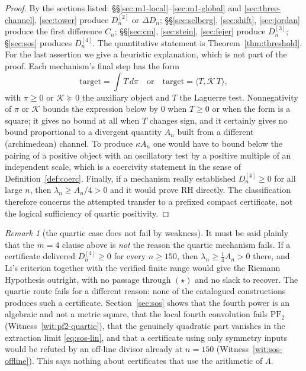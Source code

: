 \documentclass[11pt]{amsart}
\theoremstyle{definition}
\theoremstyle{remark}
\newtheorem{remark}[theorem]{Remark}
\theoremstyle{definition}
\begin{document}
\begin{proof}
By the sections listed: \S\S\ref{sec:m1-local}--\ref{sec:m1-global} and
\ref{sec:three-channel}, \ref{sec:tower} produce $D_n^{[2]}$ or $\Delta D_n$;
\S\S\ref{sec:selberg}, \ref{sec:shift}, \ref{sec:jordan} produce the first difference $C_n$;
\S\S\ref{sec:cm}, \ref{sec:stein}, \ref{sec:fejer} produce $D_n^{[3]}$; \S\ref{sec:sos} produces
$D_n^{[4]}$. The quantitative statement is Theorem~\ref{thm:threshold}. For the last assertion we
give a heuristic explanation, which is not part of the proof. Each mechanism's final step has the form
\[
   \text{target}=\int T\,d\pi\quad\text{or}\quad\text{target}=\langle T,\mathcal K\,T\rangle,
\]
with $\pi\ge0$ or $\mathcal K\succeq0$ the auxiliary object and $T$ the Laguerre test. Nonnegativity
of $\pi$ or $\mathcal K$ bounds the expression below by $0$ when $T\ge0$ or when the form is a
square; it gives no bound at all when $T$ changes sign, and it certainly gives no bound proportional
to a divergent quantity $A_n$ built from a different (archimedean) channel. To produce
$\kappa A_n$ one would have to bound below the pairing of a positive object with an oscillatory test
by a positive multiple of an independent scale, which is a coercivity statement in the sense of
Definition~\ref{def:coerc}. Finally, if a mechanism really established
$D_n^{[4]}\ge0$ for all large $n$, then $\lambda_n\ge A_n/4>0$ and it would prove RH directly.
The classification therefore concerns the attempted transfer to a prefixed compact certificate,
not the logical sufficiency of quartic positivity.
\end{proof}

\begin{remark}[the quartic case does not fail by weakness]\label{rmk:quartic-exists}
It must be said plainly that the $m=4$ clause above is \emph{not} the reason the quartic
mechanism fails. If a certificate delivered $D_n^{[4]}\ge0$ for every $n\ge150$, then
$\lambda_n\ge\tfrac14A_n>0$ there, and Li's criterion together with the verified finite range
would give the Riemann Hypothesis outright, with no passage through $(\star)$ and no slack to
recover. The quartic route fails for a different reason: none of the catalogued constructions
produces such a certificate. Section~\ref{sec:sos} shows that the fourth power is an algebraic
and not a metric square, that the local fourth convolution fails $\mathrm{PF}_2$
(Witness~\ref{wit:pf2-quartic}), that the genuinely quadratic part vanishes in the extraction
limit \eqref{eq:sos-lin}, and that a certificate using only symmetry inputs would be refuted by an
off-line divisor already at $n=150$ (Witness~\ref{wit:sos-offline}). This says nothing about
certificates that use the arithmetic of $\Lambda$.
\end{remark}
\end{document}
